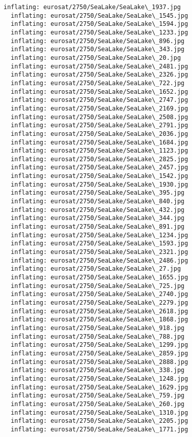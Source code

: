 \documentclass[11pt]{article}
\begin{document}
\begin{Verbatim}[commandchars=\\\{\}]
  inflating: eurosat/2750/SeaLake/SeaLake\_1937.jpg
  inflating: eurosat/2750/SeaLake/SeaLake\_1545.jpg
  inflating: eurosat/2750/SeaLake/SeaLake\_1594.jpg
  inflating: eurosat/2750/SeaLake/SeaLake\_1233.jpg
  inflating: eurosat/2750/SeaLake/SeaLake\_896.jpg
  inflating: eurosat/2750/SeaLake/SeaLake\_343.jpg
  inflating: eurosat/2750/SeaLake/SeaLake\_20.jpg
  inflating: eurosat/2750/SeaLake/SeaLake\_2481.jpg
  inflating: eurosat/2750/SeaLake/SeaLake\_2326.jpg
  inflating: eurosat/2750/SeaLake/SeaLake\_722.jpg
  inflating: eurosat/2750/SeaLake/SeaLake\_1652.jpg
  inflating: eurosat/2750/SeaLake/SeaLake\_2747.jpg
  inflating: eurosat/2750/SeaLake/SeaLake\_2169.jpg
  inflating: eurosat/2750/SeaLake/SeaLake\_2508.jpg
  inflating: eurosat/2750/SeaLake/SeaLake\_2791.jpg
  inflating: eurosat/2750/SeaLake/SeaLake\_2036.jpg
  inflating: eurosat/2750/SeaLake/SeaLake\_1684.jpg
  inflating: eurosat/2750/SeaLake/SeaLake\_1123.jpg
  inflating: eurosat/2750/SeaLake/SeaLake\_2825.jpg
  inflating: eurosat/2750/SeaLake/SeaLake\_2457.jpg
  inflating: eurosat/2750/SeaLake/SeaLake\_1542.jpg
  inflating: eurosat/2750/SeaLake/SeaLake\_1930.jpg
  inflating: eurosat/2750/SeaLake/SeaLake\_395.jpg
  inflating: eurosat/2750/SeaLake/SeaLake\_840.jpg
  inflating: eurosat/2750/SeaLake/SeaLake\_432.jpg
  inflating: eurosat/2750/SeaLake/SeaLake\_344.jpg
  inflating: eurosat/2750/SeaLake/SeaLake\_891.jpg
  inflating: eurosat/2750/SeaLake/SeaLake\_1234.jpg
  inflating: eurosat/2750/SeaLake/SeaLake\_1593.jpg
  inflating: eurosat/2750/SeaLake/SeaLake\_2321.jpg
  inflating: eurosat/2750/SeaLake/SeaLake\_2486.jpg
  inflating: eurosat/2750/SeaLake/SeaLake\_27.jpg
  inflating: eurosat/2750/SeaLake/SeaLake\_1655.jpg
  inflating: eurosat/2750/SeaLake/SeaLake\_725.jpg
  inflating: eurosat/2750/SeaLake/SeaLake\_2740.jpg
  inflating: eurosat/2750/SeaLake/SeaLake\_2279.jpg
  inflating: eurosat/2750/SeaLake/SeaLake\_2618.jpg
  inflating: eurosat/2750/SeaLake/SeaLake\_1868.jpg
  inflating: eurosat/2750/SeaLake/SeaLake\_918.jpg
  inflating: eurosat/2750/SeaLake/SeaLake\_788.jpg
  inflating: eurosat/2750/SeaLake/SeaLake\_1299.jpg
  inflating: eurosat/2750/SeaLake/SeaLake\_2859.jpg
  inflating: eurosat/2750/SeaLake/SeaLake\_2888.jpg
  inflating: eurosat/2750/SeaLake/SeaLake\_338.jpg
  inflating: eurosat/2750/SeaLake/SeaLake\_1248.jpg
  inflating: eurosat/2750/SeaLake/SeaLake\_1629.jpg
  inflating: eurosat/2750/SeaLake/SeaLake\_759.jpg
  inflating: eurosat/2750/SeaLake/SeaLake\_260.jpg
  inflating: eurosat/2750/SeaLake/SeaLake\_1310.jpg
  inflating: eurosat/2750/SeaLake/SeaLake\_2205.jpg
  inflating: eurosat/2750/SeaLake/SeaLake\_1771.jpg

\end{Verbatim}
\end{document}
